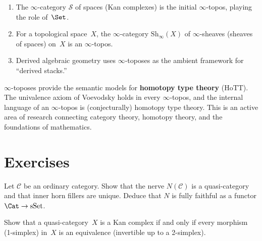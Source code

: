 \begin{example}\label{ex:infty-toposes}
\begin{enumerate}[label=(\roman*)]
\item The $\infty$-category $\mathcal{S}$ of spaces (Kan complexes) is
      the initial $\infty$-topos, playing the role of~$\Set$.
\item For a topological space~$X$, the $\infty$-category
      $\mathrm{Sh}_\infty(X)$ of $\infty$-sheaves (sheaves of spaces)
      on~$X$ is an $\infty$-topos.
\item Derived algebraic geometry uses $\infty$-toposes as the ambient
      framework for ``derived stacks.''
\end{enumerate}
\end{example}

\begin{remark}\label{rem:hott}
$\infty$-toposes provide the semantic models for \textbf{homotopy type
theory} (HoTT).  The univalence axiom of Voevodsky holds in every
$\infty$-topos, and the internal language of an $\infty$-topos is
(conjecturally) homotopy type theory.  This is an active area of research
connecting category theory, homotopy theory, and the foundations of
mathematics.
\end{remark}



\section{Exercises}\label{sec:infty-exercises}

\begin{exercise}\label{ex:nerve-quasi}
Let $\mathcal{C}$ be an ordinary category.  Show that the nerve
$N(\mathcal{C})$ is a quasi-category and that inner horn fillers
are unique.  Deduce that $N$ is fully faithful as a functor
$\Cat\to\mathrm{sSet}$.
\end{exercise}

\begin{exercise}\label{ex:kan-groupoid}
Show that a quasi-category~$X$ is a Kan complex if and only if every
morphism (1-simplex) in~$X$ is an equivalence (invertible up to a
2-simplex).
\end{exercise}

